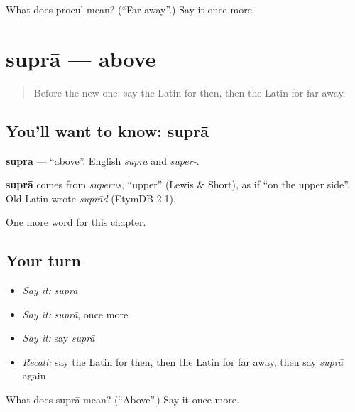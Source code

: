 \begin{tcolorbox}[breakable,colback=teal!4,colframe=teal!35!black,title={Before you move on}]
What does procul mean? (\textquotedblleft{}Far away\textquotedblright{}.) Say it once more.
\end{tcolorbox}
\section[suprā]{suprā — above}

\label{lesson:LA-C102-supra}



\begin{quote}
Before the new one: say the Latin for then, then the Latin for far away.
\end{quote}

\subsection*{You'll want to know: suprā}
\textbf{suprā} — \textquotedblleft{}above\textquotedblright{}. English \emph{supra} and \emph{super-}.

\begin{cousinweb}
\textbf{suprā} comes from \emph{superus}, \textquotedblleft{}upper\textquotedblright{} (Lewis \& Short), as if \textquotedblleft{}on the upper side\textquotedblright{}. Old Latin wrote \emph{suprād} (EtymDB 2.1).
\end{cousinweb}

\begin{grammarlens}[title={What you've built}]
One more word for this chapter.
\end{grammarlens}

\subsection*{Your turn}
\begin{itemize}
\raggedright
  \item \emph{Say it:} \emph{suprā}
  \item \emph{Say it:} \emph{suprā}, once more
  \item \emph{Say it:} say \emph{suprā}
  \item \emph{Recall:} say the Latin for then, then the Latin for far away, then say \emph{suprā} again
\end{itemize}

\begin{tcolorbox}[breakable,colback=teal!4,colframe=teal!35!black,title={Before you move on}]
What does suprā mean? (\textquotedblleft{}Above\textquotedblright{}.) Say it once more.
\end{tcolorbox}
